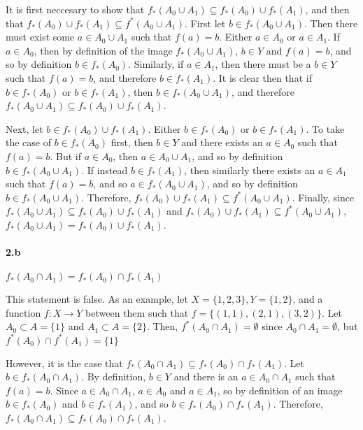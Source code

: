 \documentclass[12pt, letterpaper]{article}
\begin{document}
It is first neccesary to show that \(f_*(A_0 \cup A_1) \subseteq f_*(A_0) \cup f_*(A_1)\), and then that \(f_*(A_0) \cup f_*(A_1) \subseteq f^*(A_0 \cup A_1) \). First let \(b \in f_*(A_0 \cup A_1)\). Then there must exist some \(a \in A_0 \cup A_1\) such that \(f(a) = b\). Either \(a \in A_0\) or \(a \in A_1\). If \(a \in A_0\), then by definition of the image \(f_*(A_0 \cup A_1)\), \(b \in Y\) and \(f(a) = b\), and so by definition \(b \in f_*(A_0)\). Similarly, if \(a \in A_1\), then there must be a \(b \in Y\) such that \(f(a) = b\), and therefore  \(b \in f_*(A_1)\). It is clear then that if \(b \in f_*(A_0)\) or  \(b \in f_*(A_1)\), then  \(b \in f_*(A_0 \cup A_1)\), and therefore \(f_*(A_0 \cup A_1) \subseteq f_*(A_0) \cup f_*(A_1)\).

Next, let \(b \in f_*(A_0) \cup f_*(A_1)\). Either \(b \in f_*(A_0)\) or \(b \in f_*(A_1)\). To take the case of \(b \in f_*(A_0)\) first, then \(b \in Y\) and there exists an \(a \in A_0\) such that \(f(a) = b\). But if \(a \in A_0\), then \(a \in A_0 \cup A_1\), and so by definition \(b \in f_*(A_0\cup A_1)\). If instead \(b \in f_*(A_1)\), then similarly there exists an \(a \in A_1\) such that \(f(a) = b\), and so \(a \in f_*(A_0 \cup A_1)\), and so by definition \(b \in f_*(A_0\cup A_1)\). Therefore, \(f_*(A_0) \cup f_*(A_1) \subseteq f^*(A_0 \cup A_1) \). Finally, since \(f_*(A_0 \cup A_1) \subseteq f_*(A_0) \cup f_*(A_1)\) and \(f_*(A_0) \cup f_*(A_1) \subseteq f^*(A_0 \cup A_1) \), \(f_*(A_0 \cup A_1) = f_*(A_0) \cup f_*(A_1)\).

\paragraph{2.b} \(f_*(A_0 \cap A_1) = f_*(A_0) \cap f_*(A_1)\)

This statement is false. As an example, let \(X = \{1,2,3\}, Y = \{1, 2\}\), and a function \(f: X \rightarrow Y\) between them such that \(f= \{(1,1), (2,1), (3,2)\}\). Let \(A_0 \subset A = \{1\}\) and \(A_1 \subset A = \{2\}\). Then, \(f^*(A_0 \cap A_1) = \emptyset\) since \(A_0 \cap A_1 = \emptyset\), but \(f^*(A_0) \cap f^*(A_1) = \{1\}\)

However, it is the case that \(f_*(A_0 \cap A_1) \subseteq f_*(A_0) \cap f_*(A_1)\). Let \(b \in f_*(A_0 \cap A_1)\). By definition, \(b \in Y\) and there is an \(a \in A_0 \cap A_1\) such that \(f(a) = b\). Since \(a \in A_0 \cap A_1 \), \(a \in A_0\) and \(a \in A_1\), so by definition of an image \(b \in f_*(A_0)\) and \(b \in f_*(A_1)\), and so \(b \in f_*(A_0) \cap f_*(A_1)\). Therefore, \(f_*(A_0 \cap A_1) \subseteq f_*(A_0) \cap f_*(A_1)\). 
\end{document}
